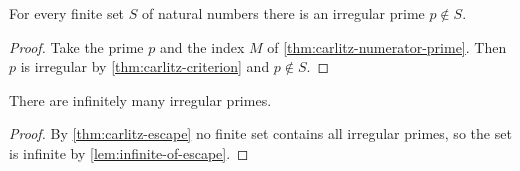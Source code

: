 \begin{theorem}\label{thm:carlitz-escape}
  \leanok
For every finite set $S$ of natural numbers there is an irregular prime
$p \notin S$.
\end{theorem}
\begin{proof}\leanok
Take the prime $p$ and the index $M$ of \cref{thm:carlitz-numerator-prime}.
Then $p$ is irregular by \cref{thm:carlitz-criterion} and $p \notin S$.
\end{proof}

\begin{theorem}\label{thm:infinitely-many-irregular}
  \leanok
There are infinitely many irregular primes.
\end{theorem}
\begin{proof}\leanok
By \cref{thm:carlitz-escape} no finite set contains all irregular primes, so
the set is infinite by \cref{lem:infinite-of-escape}.
\end{proof}
